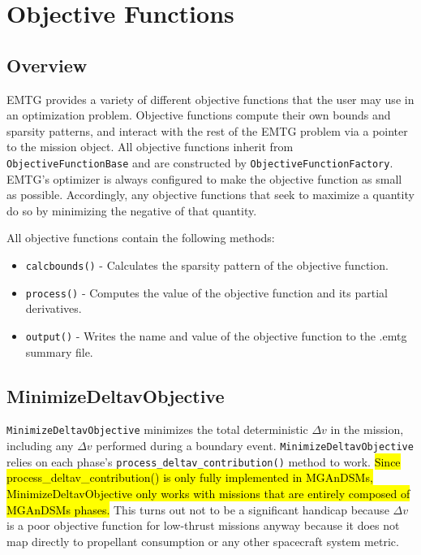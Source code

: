 

\chapter{Objective Functions}
\label{chap:ObjectiveFunctions}

\section{Overview}
\label{sec:objectivefunction_overview}

\ac{EMTG} provides a variety of different objective functions that the user may use in an optimization problem. Objective functions compute their own bounds and sparsity patterns, and interact with the rest of the \ac{EMTG} problem via a pointer to the mission object. All objective functions inherit from \texttt{ObjectiveFunctionBase} and are constructed by \texttt{ObjectiveFunctionFactory}. \ac{EMTG}'s optimizer is always configured to make the objective function as small as possible. Accordingly, any objective functions that seek to maximize a quantity do so by minimizing the negative of that quantity.

All objective functions contain the following methods:

\begin{itemize}
	\item \texttt{calcbounds()} - Calculates the sparsity pattern of the objective function.
	\item \texttt{process()} - Computes the value of the objective function and its partial derivatives.
	\item \texttt{output()} - Writes the name and value of the objective function to the .emtg summary file.
\end{itemize}

\section{MinimizeDeltavObjective}
\label{sec:MinimizeDeltavObjective}

\texttt{MinimizeDeltavObjective} minimizes the total deterministic $\Delta v$ in the mission, including any $\Delta v$ performed during a boundary event. \texttt{MinimizeDeltavObjective} relies on each phase's \texttt{process\_deltav\_contribution()} method to work. \hl{Since process\_deltav\_contribution() is only fully implemented in MGAnDSMs, MinimizeDeltavObjective only works with missions that are entirely composed of MGAnDSMs phases.} This turns out not to be a significant handicap because $\Delta v$ is a poor objective function for low-thrust missions anyway because it does not map directly to propellant consumption or any other spacecraft system metric.

